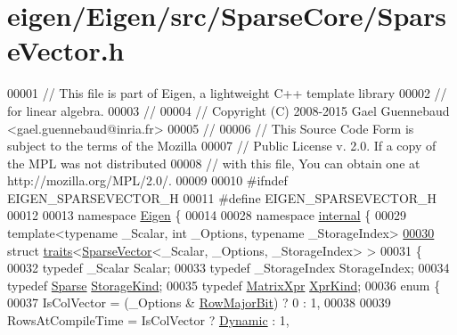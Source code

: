 \hypertarget{eigen_2_eigen_2src_2_sparse_core_2_sparse_vector_8h_source}{}\section{eigen/\+Eigen/src/\+Sparse\+Core/\+Sparse\+Vector.h}
\label{eigen_2_eigen_2src_2_sparse_core_2_sparse_vector_8h_source}

\begin{DoxyCode}
00001 \textcolor{comment}{// This file is part of Eigen, a lightweight C++ template library}
00002 \textcolor{comment}{// for linear algebra.}
00003 \textcolor{comment}{//}
00004 \textcolor{comment}{// Copyright (C) 2008-2015 Gael Guennebaud <gael.guennebaud@inria.fr>}
00005 \textcolor{comment}{//}
00006 \textcolor{comment}{// This Source Code Form is subject to the terms of the Mozilla}
00007 \textcolor{comment}{// Public License v. 2.0. If a copy of the MPL was not distributed}
00008 \textcolor{comment}{// with this file, You can obtain one at http://mozilla.org/MPL/2.0/.}
00009 
00010 \textcolor{preprocessor}{#ifndef EIGEN\_SPARSEVECTOR\_H}
00011 \textcolor{preprocessor}{#define EIGEN\_SPARSEVECTOR\_H}
00012 
00013 \textcolor{keyword}{namespace }\hyperlink{namespace_eigen}{Eigen} \{ 
00014 
00028 \textcolor{keyword}{namespace }\hyperlink{namespaceinternal}{internal} \{
00029 \textcolor{keyword}{template}<\textcolor{keyword}{typename} \_Scalar, \textcolor{keywordtype}{int} \_Options, \textcolor{keyword}{typename} \_StorageIndex>
\hyperlink{struct_eigen_1_1internal_1_1traits_3_01_sparse_vector_3_01___scalar_00_01___options_00_01___storage_index_01_4_01_4}{00030} \textcolor{keyword}{struct }\hyperlink{struct_eigen_1_1internal_1_1traits}{traits}<\hyperlink{group___sparse_core___module_class_eigen_1_1_sparse_vector}{SparseVector}<\_Scalar, \_Options, \_StorageIndex> >
00031 \{
00032   \textcolor{keyword}{typedef} \_Scalar Scalar;
00033   \textcolor{keyword}{typedef} \_StorageIndex StorageIndex;
00034   \textcolor{keyword}{typedef} \hyperlink{struct_eigen_1_1_sparse}{Sparse} \hyperlink{struct_eigen_1_1_sparse}{StorageKind};
00035   \textcolor{keyword}{typedef} \hyperlink{struct_eigen_1_1_matrix_xpr}{MatrixXpr} \hyperlink{struct_eigen_1_1_matrix_xpr}{XprKind};
00036   \textcolor{keyword}{enum} \{
00037     IsColVector = (\_Options & \hyperlink{group__flags_gae4f56c2a60bbe4bd2e44c5b19cbe8762}{RowMajorBit}) ? 0 : 1,
00038 
00039     RowsAtCompileTime = IsColVector ? \hyperlink{namespace_eigen_ad81fa7195215a0ce30017dfac309f0b2}{Dynamic} : 1,

\end{DoxyCode}
